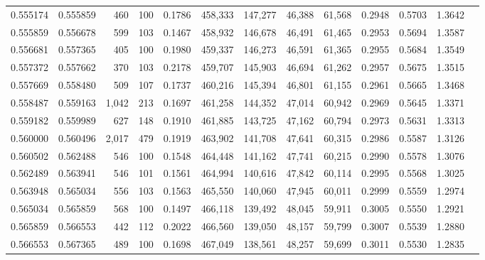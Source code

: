 \begin{tabular}{rrrrrrrrrrrrr}
0.555174 & 0.555859 &   460 & 100 &                                     0.1786 & 458,333 & 147,277 &  46,388 &  61,568 & 0.2948 & 0.5703 & 1.3642 \\
0.555859 & 0.556678 &   599 & 103 &                                     0.1467 & 458,932 & 146,678 &  46,491 &  61,465 & 0.2953 & 0.5694 & 1.3587 \\
0.556681 & 0.557365 &   405 & 100 &                                     0.1980 & 459,337 & 146,273 &  46,591 &  61,365 & 0.2955 & 0.5684 & 1.3549 \\
0.557372 & 0.557662 &   370 & 103 &                                     0.2178 & 459,707 & 145,903 &  46,694 &  61,262 & 0.2957 & 0.5675 & 1.3515 \\
0.557669 & 0.558480 &   509 & 107 &                                     0.1737 & 460,216 & 145,394 &  46,801 &  61,155 & 0.2961 & 0.5665 & 1.3468 \\
0.558487 & 0.559163 & 1,042 & 213 &                                     0.1697 & 461,258 & 144,352 &  47,014 &  60,942 & 0.2969 & 0.5645 & 1.3371 \\
0.559182 & 0.559989 &   627 & 148 &                                     0.1910 & 461,885 & 143,725 &  47,162 &  60,794 & 0.2973 & 0.5631 & 1.3313 \\
0.560000 & 0.560496 & 2,017 & 479 &                                     0.1919 & 463,902 & 141,708 &  47,641 &  60,315 & 0.2986 & 0.5587 & 1.3126 \\
0.560502 & 0.562488 &   546 & 100 &                                     0.1548 & 464,448 & 141,162 &  47,741 &  60,215 & 0.2990 & 0.5578 & 1.3076 \\
0.562489 & 0.563941 &   546 & 101 &                                     0.1561 & 464,994 & 140,616 &  47,842 &  60,114 & 0.2995 & 0.5568 & 1.3025 \\
0.563948 & 0.565034 &   556 & 103 &                                     0.1563 & 465,550 & 140,060 &  47,945 &  60,011 & 0.2999 & 0.5559 & 1.2974 \\
0.565034 & 0.565859 &   568 & 100 &                                     0.1497 & 466,118 & 139,492 &  48,045 &  59,911 & 0.3005 & 0.5550 & 1.2921 \\
0.565859 & 0.566553 &   442 & 112 &                                     0.2022 & 466,560 & 139,050 &  48,157 &  59,799 & 0.3007 & 0.5539 & 1.2880 \\
0.566553 & 0.567365 &   489 & 100 &                                     0.1698 & 467,049 & 138,561 &  48,257 &  59,699 & 0.3011 & 0.5530 & 1.2835 \\

\end{tabular}
